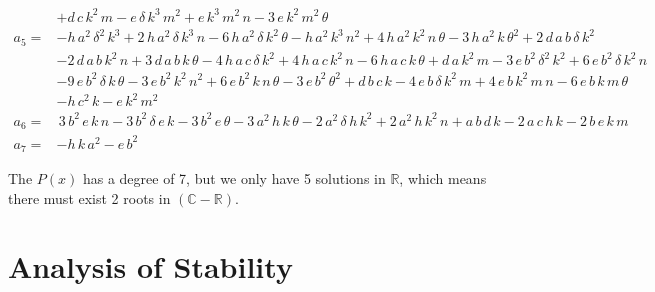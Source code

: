 \documentclass{article}
\begin{document}
\begin{align*}
    &+d\,c\,k^2\,m-e\,\delta \,k^3\,m^2+e\,k^3\,m^2\,n-3\,e\,k^2\,m^2\,\theta \\
    a_{5}=&-h\,a^2\,\delta ^2\,k^3+2\,h\,a^2\,\delta \,k^3\,n-6\,h\,a^2\,\delta \,k^2\,\theta -h\,a^2\,k^3\,n^2+4\,h\,a^2\,k^2\,n\,\theta -3\,h\,a^2\,k\,\theta ^2+2\,d\,a\,b\,\delta \,k^2\\
    &-2\,d\,a\,b\,k^2\,n+3\,d\,a\,b\,k\,\theta -4\,h\,a\,c\,\delta \,k^2+4\,h\,a\,c\,k^2\,n-6\,h\,a\,c\,k\,\theta +d\,a\,k^2\,m-3\,e\,b^2\,\delta ^2\,k^2+6\,e\,b^2\,\delta \,k^2\,n\\
    &-9\,e\,b^2\,\delta \,k\,\theta -3\,e\,b^2\,k^2\,n^2+6\,e\,b^2\,k\,n\,\theta -3\,e\,b^2\,\theta ^2+d\,b\,c\,k-4\,e\,b\,\delta \,k^2\,m+4\,e\,b\,k^2\,m\,n-6\,e\,b\,k\,m\,\theta \\
    &-h\,c^2\,k-e\,k^2\,m^2\\
    a_{6}=&\,3\,b^2\,e\,k\,n-3\,b^2\,\delta \,e\,k-3\,b^2\,e\,\theta -3\,a^2\,h\,k\,\theta -2\,a^2\,\delta \,h\,k^2+2\,a^2\,h\,k^2\,n+a\,b\,d\,k-2\,a\,c\,h\,k-2\,b\,e\,k\,m\\
    a_{7}=&-h\,k\,a^2-e\,b^2
\end{align*}
\par The $P(x)$ has a degree of 7, but we only have 5 solutions in $\mathbb{R}$, which means there must exist 2 roots in $(\mathbb{C}-\mathbb{R})$.

\section{Analysis of Stability}
\end{document}
